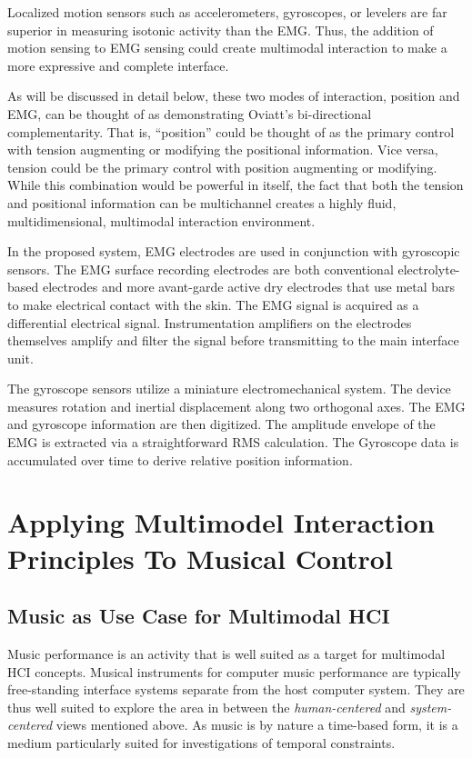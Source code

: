 Localized motion sensors such as accelerometers, gyroscopes, or levelers are far superior in measuring isotonic activity than the EMG. Thus, the addition of motion sensing to EMG sensing could create multimodal interaction to make a more expressive and complete interface.

As will be discussed in detail below, these two modes of interaction, position and EMG, can be thought of as demonstrating Oviatt's bi-directional complementarity.  That is, ``position'' could be thought of as the primary control with tension augmenting or modifying the positional information.  Vice versa, tension could be the primary control with position augmenting or modifying.  While this combination would be powerful in itself, the fact that both the tension and positional information can be multichannel creates a highly fluid, multidimensional, multimodal interaction environment.
  
In the proposed system, EMG electrodes are used in conjunction with gyroscopic sensors. The EMG surface recording electrodes are both conventional electrolyte-based electrodes and  more avant-garde active dry electrodes that use metal bars to make electrical contact with the skin. The EMG signal is acquired as a differential electrical signal. Instrumentation amplifiers on the electrodes themselves amplify and filter the signal before transmitting to the main interface unit.

The gyroscope sensors utilize a miniature electromechanical system. The device measures rotation and inertial displacement along two orthogonal axes.
The EMG and gyroscope information are then digitized. The amplitude envelope of the EMG is extracted via a straightforward RMS calculation. The Gyroscope data is accumulated over time to derive relative position information.


\section{Applying Multimodel Interaction Principles To Musical Control}


\subsection{Music as Use Case for Multimodal HCI}


Music performance is an activity that is well suited as a target for multimodal HCI concepts. Musical instruments for computer music performance are typically free-standing interface systems separate from the host computer system. They are thus well suited to explore the area in between the \textit{human-centered} and \textit{system-centered} views mentioned above. As music is by nature a time-based form, it is a medium particularly suited for investigations of temporal constraints. 

